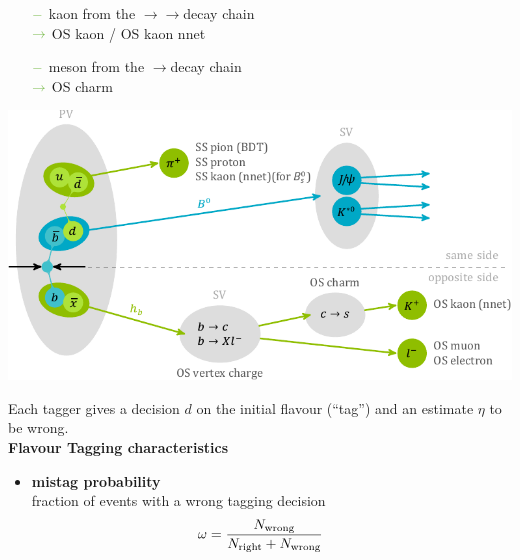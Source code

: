 {\begin{itemize}
\begin{itemize}
\item[${\color{tu_gruen}-}$] kaon from the \bquark$\rightarrow$\cquark$\rightarrow$\squark decay chain \\ ${\color{tu_gruen}\rightarrow}$ OS kaon / OS kaon nnet
\item[${\color{tu_gruen}-}$] \D meson from the \bquark$\rightarrow$\cquark decay chain \\ ${\color{tu_gruen}\rightarrow}$ OS charm
\end{itemize}
\end{itemize}
\begin{center}
\includegraphics[width=\textwidth]{FTScheme/FlavourTaggerScheme.pdf}
\end{center}
\vspace{-0.4em}
Each tagger gives a decision $d$ on the initial flavour \newline(“tag”) and an estimate $\eta$ to be wrong.\\[0.3cm]
\vspace{-0.35em}
\textbf{Flavour Tagging characteristics}
\vspace{0.1em}
\begin{itemize}
\item \textbf{mistag probability} \\[0.04cm] 
fraction of events with a wrong tagging decision
\begin{equation*}
\hspace{-1.6em}
\omega=\frac{N_{\text{wrong}}}{N_{\text{right}}+N_{\text{wrong}}}
\end{equation*}

\end{itemize}}
